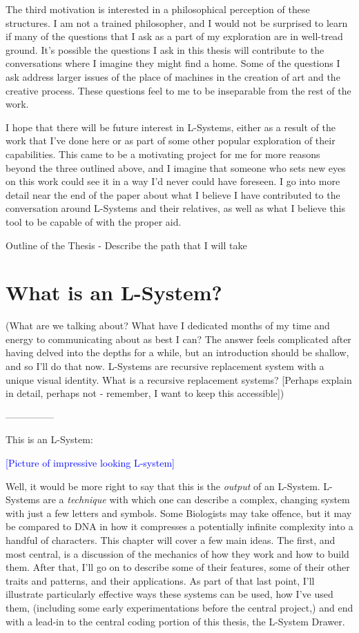 \documentclass[12pt,twoside]{reedthesis}
\begin{document}
	The third motivation is interested in a philosophical perception of these structures. I am not a trained philosopher, and I would not be surprised to learn if many of the questions that I ask as a part of my exploration are in well-tread ground. It’s possible the questions I ask in this thesis will contribute to the conversations where I imagine they might find a home. Some of the questions I ask address larger issues of the place of machines in the creation of art and the creative process. These questions feel to me to be inseparable from the rest of the work.
	
	I hope that there will be future interest in L-Systems, either as a result of the work that I’ve done here or as part of some other popular exploration of their capabilities. This came to be a motivating project for me for more reasons beyond the three outlined above, and I imagine that someone who sets new eyes on this work could see it in a way I’d never could have foreseen. I go into more detail near the end of the paper about what I believe I have contributed to the conversation around L-Systems and their relatives, as well as what I believe this tool to be capable of with the proper aid.
	
	Outline of the Thesis - Describe the path that I will take

	
	
\chapter{What is an L-System?}
(What are we talking about? What have I dedicated months of my time and energy to communicating about as best I can? The answer feels complicated after having delved into the depths for a while, but an introduction should be shallow, and so I’ll do that now. L-Systems are recursive replacement system with a unique visual identity. What is a recursive replacement systems? [Perhaps explain in detail, perhaps not - remember, I want to keep this accessible])

—————

This is an L-System:

\textcolor{blue}{[Picture of impressive looking L-system]}

Well, it would be more right to say that this is the \textit{output} of an L-System. L-Systems are a \textit{technique} with which one can describe a complex, changing system with just a few letters and symbols. Some Biologists may take offence, but it may be compared to DNA in how it compresses a potentially infinite complexity into a handful of characters. This chapter will cover a few main ideas. The first, and most central, is a discussion of the mechanics of how they work and how to build them. After that, I’ll go on to describe some of their features, some of their other traits and patterns, and their applications. As part of that last point, I’ll illustrate particularly effective ways these systems can be used, how I’ve used them, (including some early experimentations before the central project,) and end with a lead-in to the central coding portion of this thesis, the L-System Drawer.
\end{document}

